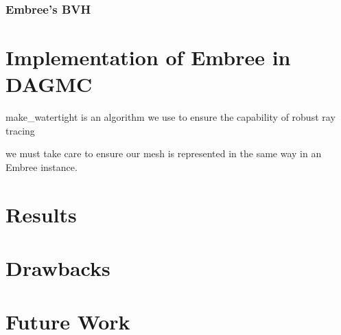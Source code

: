 \documentclass[12pt]{beamer}
\begin{document}
\begin{frame}
\frametitle{Embree's BVH}

\end{frame}



\section{Implementation of Embree in DAGMC} %
\begin{frame}
  make\_watertight \cite{make_watertight_smith_2010} is an algorithm we use to ensure the capability of robust ray tracing


  we must take care to ensure our mesh is represented in the same way in an Embree instance. 
  

\end{frame}

\section{Results} %
\section{Drawbacks} %
\section{Future Work} %


\begin{frame}
  
  
\end{frame}

\end{document}
